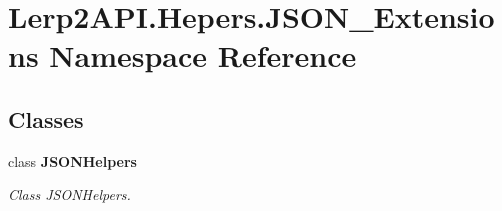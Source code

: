 \hypertarget{namespace_lerp2_a_p_i_1_1_hepers_1_1_j_s_o_n___extensions}{}\section{Lerp2\+A\+P\+I.\+Hepers.\+J\+S\+O\+N\+\_\+\+Extensions Namespace Reference}
\label{namespace_lerp2_a_p_i_1_1_hepers_1_1_j_s_o_n___extensions}
\subsection*{Classes}
\begin{DoxyCompactItemize}
\item 
class {\bfseries J\+S\+O\+N\+Helpers}
\begin{DoxyCompactList}\small\item\em Class J\+S\+O\+N\+Helpers. \end{DoxyCompactList}\end{DoxyCompactItemize}
